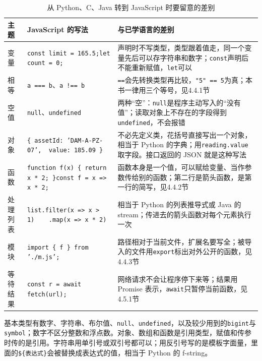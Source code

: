 \begin{table}[htbp]
\centering
\caption{从 Python、C、Java 转到 JavaScript 时要留意的差别}
\label{tab:ch04-js-bridge}
\small
\begin{tabular}{p{2.1cm}p{5.3cm}p{6.2cm}}
\toprule
主题 & JavaScript 的写法 & 与已学语言的差别 \\
\midrule
变量 & \texttt{const limit = 165.5;}\newline \texttt{let count = 0;} & 声明时不写类型，类型跟着值走，同一个变量先后可以存字符串和数字；\texttt{const}声明后不能重新赋值，\texttt{let}可以 \\
相等 & \texttt{a === b}、\texttt{a !== b} & \texttt{==}会先转换类型再比较，\texttt{"5" == 5}为真；本书一律用三个等号，见4.4.1节 \\
空值 & \texttt{null}、\texttt{undefined} & 两种“空”：\texttt{null}是程序主动写入的“没有值”；读取对象上不存在的字段得到\texttt{undefined}，不会报错 \\
对象 & \texttt{\{ assetId: 'DAM-A-PZ-07',}\newline \texttt{\ \ value: 185.09 \}} & 不必先定义类，花括号直接写出一个对象，相当于 Python 的字典；用\texttt{reading.value}取字段。接口返回的 JSON 就是这种写法 \\
函数 & \texttt{function f(x) \{ return x * 2; \}}\newline \texttt{const f = x => x * 2;} & 函数本身是一个值，可以赋给变量、当作参数传给别的函数；第二行是箭头函数，是第一行的简写，见4.4.2节 \\
处理列表 & \texttt{list.filter(x => x > 1)}\newline \texttt{\ \ \ \ .map(x => x * 2)} & 相当于 Python 的列表推导式或 Java 的 stream；传进去的箭头函数对每个元素执行一次 \\
模块 & \texttt{import \{ f \} from './m.js';} & 路径相对于当前文件，扩展名要写全；被导入的文件用\texttt{export}标出对外公开的函数，见4.4.3节 \\
等待结果 & \texttt{const r = await fetch(url);} & 网络请求不会让程序停下来等；结果用 Promise 表示，\texttt{await}只暂停当前函数，见4.5.1节 \\
\bottomrule
\end{tabular}
\end{table}

基本类型有数字、字符串、布尔值、\texttt{null}、\texttt{undefined}，以及较少用到的\texttt{bigint}与\texttt{symbol}；数字不区分整数和浮点数。对象、数组和函数是引用类型，赋值和传参时传的是引用。字符串用单引号或双引号都可以；用反引号写的是模板字面量，里面的\texttt{\$\{表达式\}}会被替换成表达式的值，相当于 Python 的 f-string。

